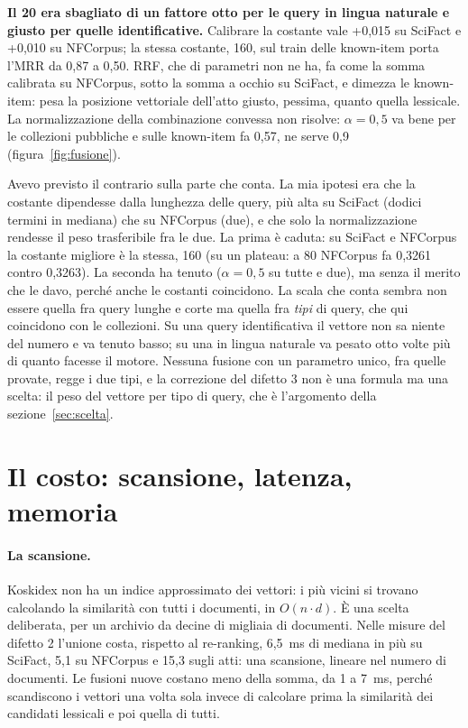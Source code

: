 \textbf{Il 20 era sbagliato di un fattore otto per le query in lingua naturale e
giusto per quelle identificative.} Calibrare la costante vale +0,015 su
SciFact e +0,010 su NFCorpus; la stessa costante, 160, sul train delle known-item porta
l'MRR da 0,87 a 0,50. RRF, che di parametri non ne ha, fa come la somma calibrata su
NFCorpus, sotto la somma a occhio su SciFact, e dimezza le known-item: pesa la
posizione vettoriale dell'atto giusto, pessima, quanto quella lessicale. La
normalizzazione della combinazione convessa non risolve: $\alpha = 0{,}5$ va bene per
le collezioni pubbliche e sulle known-item fa 0,57, ne serve 0,9 (figura~\ref{fig:fusione}).



Avevo previsto il contrario sulla parte che conta. La mia ipotesi era che la
costante dipendesse dalla lunghezza delle query, più alta su SciFact (dodici termini
in mediana) che su NFCorpus (due), e che solo la normalizzazione rendesse il peso
trasferibile fra le due. La prima è caduta: su SciFact e NFCorpus la costante
migliore è la stessa, 160 (su un plateau: a 80 NFCorpus fa 0,3261 contro 0,3263). La seconda ha tenuto ($\alpha = 0{,}5$ su tutte e due),
ma senza il merito che le davo, perché anche le costanti coincidono. La scala che conta sembra non essere quella
fra query lunghe e corte ma quella fra \emph{tipi} di query, che qui coincidono con le collezioni. Su una query
identificativa il vettore non sa niente del numero e va tenuto basso; su una in
lingua naturale va pesato otto volte più di quanto facesse il motore. Nessuna
fusione con un parametro unico, fra quelle provate, regge i due tipi, e la correzione del difetto 3 non
è una formula ma una scelta: il peso del vettore per tipo di query, che è
l'argomento della sezione~\ref{sec:scelta}.

\section{Il costo: scansione, latenza, memoria}\label{sec:costo}

\paragraph{La scansione.} Koskidex non ha un indice approssimato dei vettori: i più
vicini si trovano calcolando la similarità con tutti i documenti, in $O(n \cdot d)$.
È una scelta deliberata, per un archivio da decine di migliaia di documenti. Nelle
misure del difetto 2 l'unione costa, rispetto al re-ranking, 6,5~ms di mediana in
più su SciFact, 5,1 su NFCorpus e 15,3 sugli atti: una scansione, lineare nel
numero di documenti. Le fusioni nuove costano meno della somma, da 1 a 7~ms, perché
scandiscono i vettori una volta sola invece di calcolare prima la similarità dei
candidati lessicali e poi quella di tutti.

